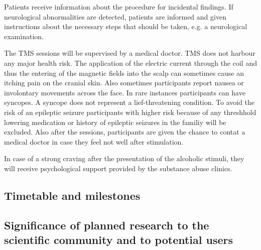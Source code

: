 \documentclass[12pt]{article}
\begin{document}
Patients receive information about the procedure for incidental findings. If neurological abnormalities are detected, patients are informed and given instructions about the necessary steps that should be taken, e.g. a neurological examination.

The TMS sessions will be supervised by a medical doctor. TMS does not harbour any major health risk. The application of the electric current through the coil and thus the entering of the magnetic fields into the scalp can sometimes cause an itching pain on the cranial skin. Also sometimes participants report nausea or involontary movements across the face. In rare instances participants can have syncopes. A syncope does not represent a lief-threatening condition. To avoid the risk of an epileptic seizure participants with higher risk because of any threshhold lowering medication or history of epileptic seizures in the familiy will be excluded. Also after the sessions, participants are given the chance to contat a medical doctor in case they feel not well after stimulation. 

In case of a strong craving after the presentation of the alcoholic stimuli, they will receive psychological support provided by the substance abuse clinics.     
 

\subsection{Timetable and milestones}


\subsection{Significance of planned research to the scientific community and to potential users}


\printbibliography  
\end{document}
